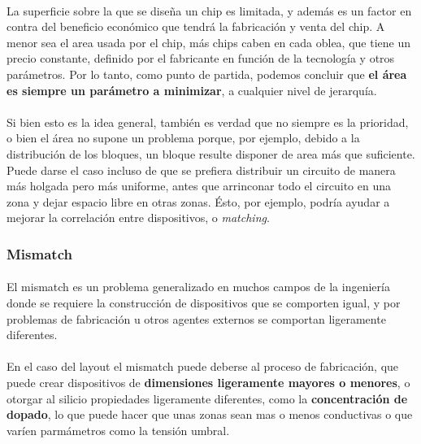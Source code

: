 \paragraph{} La superficie sobre la que se diseña un chip es limitada, y además es
un factor en contra del beneficio económico que tendrá la fabricación y venta del
chip. A menor sea el area usada por el chip, más chips caben en cada oblea, que tiene
un precio constante, definido por el fabricante en función de la tecnología y otros
parámetros. Por lo tanto, como punto de partida, podemos concluir que \textbf{el área
es siempre un parámetro a minimizar}, a cualquier nivel de jerarquía.

\paragraph{} Si bien esto es la idea general, también es verdad que no siempre es
la prioridad, o bien el área no supone un problema porque, por ejemplo, debido a la
distribución de los bloques, un bloque resulte disponer de area más que suficiente.
Puede darse el caso incluso de que se prefiera distribuir un circuito de manera más
holgada pero más uniforme, antes que arrinconar todo el circuito en una zona y dejar
espacio libre en otras zonas. Ésto, por ejemplo, podría ayudar a mejorar la correlación
entre dispositivos, o \textit{matching}.

\subsubsection{Mismatch}

\paragraph{} El mismatch es un problema generalizado en muchos campos de
la ingeniería donde se requiere la construcción de dispositivos que se comporten
igual, y por problemas de fabricación u otros agentes externos se comportan ligeramente
diferentes.

\paragraph{} En el caso del layout el mismatch puede deberse al proceso de fabricación,
que puede crear dispositivos de \textbf{dimensiones ligeramente mayores o menores},
o otorgar al silicio propiedades ligeramente diferentes, como la \textbf{concentración de
dopado}, lo que puede hacer que unas zonas sean mas o menos conductivas o que varíen
parmámetros como la tensión umbral.


